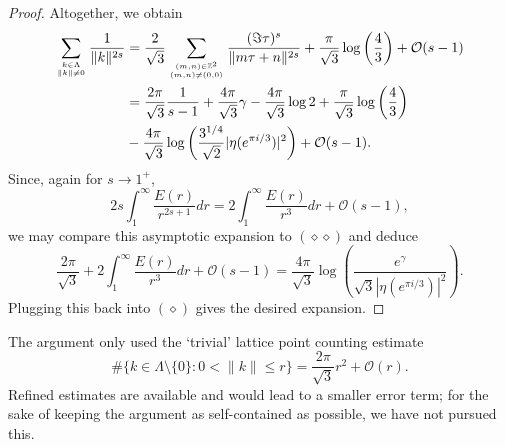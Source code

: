 \documentclass[10pt, reqno]{amsart}
\begin{document}
\begin{proof}
Altogether, we obtain
\begin{align*}
 \sum_{k \in \Lambda \atop \|k\| \neq 0} \frac{1}{\|k\|^{2s}} &= \frac{2}{\sqrt{3}} \sum_{(m,n) \in \mathbb{Z}^2 \atop (m,n) \neq (0,0)} \frac{(\Im \tau)^s}{\| m \tau + n\|^{2s}} + \frac{\pi}{\sqrt{3}}\log\left(\frac{4}{3}\right) + \mathcal{O}(s-1) \\
 &= \frac{2 \pi}{\sqrt{3}} \frac{1}{s-1} + \frac{4\pi}{\sqrt{3}} \gamma - \frac{4\pi}{\sqrt{3}} \log{2} + \frac{\pi}{\sqrt{3}}\log\left(\frac{4}{3}\right) \\
 &- \frac{4\pi}{\sqrt{3}} \log\left( \frac{3^{1/4}}{\sqrt{2}}   |\eta(e^{\pi i/3})|^2 \right) + \mathcal{O}(s-1).
\end{align*}
Since, again for $s \rightarrow 1^+$,
$$ 2s \int_1^{\infty} \frac{E(r)}{r^{2s + 1}} dr = 2 \int_1^{\infty} \frac{E(r)}{r^{3}} dr + \mathcal{O}(s-1),$$
we may compare this asymptotic expansion to $(\diamond \diamond)$ and deduce
$$ \frac{2\pi}{\sqrt{3}}  + 2 \int_1^{\infty} \frac{E(r)}{r^{3}} dr + \mathcal{O}(s-1) = \frac{4\pi}{\sqrt{3}} \log\left( \frac{e^{\gamma}}{\sqrt{3} |\eta(e^{\pi i/3})|^2} \right).$$
Plugging this back into $(\diamond)$ gives the desired expansion.
\end{proof}

The argument only used the `trivial' lattice point counting estimate
$$\#\{k \in \Lambda \setminus \{0\} : 0< \|k\| \le r\} = \frac{2 \pi}{\sqrt{3}} r^2 + \mathcal{O}(r).$$
Refined estimates are available and would lead to a smaller error term; for the sake of keeping the argument as self-contained as possible, we have not pursued this.
\end{document}
